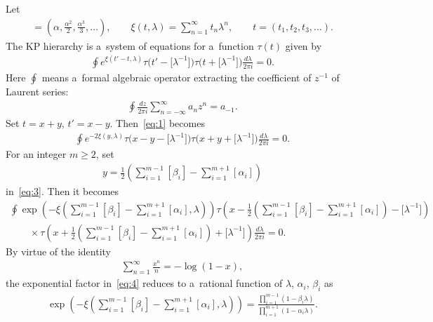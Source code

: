 \documentclass[11pt]{article}
\begin{document}
Let
\begin{gather*}
[\alpha]=\left(\alpha,\frac{\alpha^2}{2},\frac{\alpha^3}{3},\dots\right),
\qquad
\xi(t,\lambda)=\sum_{n=1}^{\infty}t_n\lambda^n,
\qquad
t=(t_1,t_2,t_3,\dots).
\end{gather*}
The KP hierarchy is a~system of equations for a~function $\tau(t)$ \cite{DJKM1,JM1, MJD1} given by
\begin{gather}
\oint e^{\xi(t'-t,\lambda)}\tau\big(t'-\big[\lambda^{-1}\big]\big)\tau\big(t+\big[\lambda^{-1}\big]\big)\frac{d\lambda}{2\pi i}=0.
\label{eq:1}
\end{gather}
Here $\oint$ means a~formal algebraic operator extracting the coef\/f\/icient of $z^{-1}$ of Laurent series:
\begin{gather*}%
\oint\frac{dz}{2\pi i}\sum_{n=-\infty}^{\infty}a_n z^n=a_{-1}.
\end{gather*}
Set $t=x+y$, $t'=x-y$.
Then~\eqref{eq:1} becomes
\begin{gather}
\oint e^{-2\xi(y,\lambda)}\tau\big(x-y-\big[\lambda^{-1}\big]\big)\tau\big(x+y+\big[\lambda^{-1}\big]\big)\frac{d\lambda}{2\pi i}=0.
\label{eq:3}
\end{gather}
For an integer $m\ge2$, set
\begin{gather}
y=\frac{1}{2}\left(\sum_{i=1}^{m-1}[\beta_i]-\sum_{i=1}^{m+1}[\alpha_i]\right)
\label{eq:22}
\end{gather}
in~\eqref{eq:3}. Then it becomes
\begin{gather}
\oint\exp\left({-\xi\left(\displaystyle\sum_{i=1}^{m-1}[\beta_i]-\sum_{i=1}^{m+1}[\alpha_i],\lambda\right)}\right)
\tau\left(x-\frac{1}{2}\left(\sum_{i=1}^{m-1}[\beta_i]-\sum_{i=1}^{m+1}[\alpha_i]\right)-\big[\lambda^{-1}
\big]\right)\nonumber
\\
\qquad
{}\times\tau\left(x+\frac{1}{2}\left(\sum_{i=1}^{m-1}[\beta_i]-\sum_{i=1}^{m+1}[\alpha_i]\right)+\big[\lambda^{-1}
\big]\right)\frac{d\lambda}{2\pi i}=0.
\label{eq:4}
\end{gather}
By virtue of the identity
\begin{gather*}
\sum_{n=1}^{\infty}\frac{x^n}{n}=-\log(1-x),
\end{gather*}
the exponential factor in~\eqref{eq:4} reduces to a~rational function of $\lambda$, $\alpha_i$, $\beta_i$ as
\begin{gather*}
\exp\left(-\xi\left(\sum_{i=1}^{m-1}[\beta_i]-\sum_{i=1}^{m+1}[\alpha_i],\lambda\right)\right)
=\frac{\prod\limits_{i=1}^{m-1}(1-\beta_i\lambda)}{\prod\limits_{i=1}^{m+1}
(1-\alpha_i\lambda)}.
\end{gather*}
\end{document}
